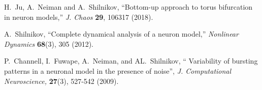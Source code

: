 \documentclass{ws-book9x6}
\begin{document}
\begin{thebibliography}{6}
H.~Ju, A.~Neiman and A.~Shilnikov, \enquote{Bottom-up approach to torus
  bifurcation in neuron models,} \emph{J. Chaos} \textbf{29}, 106317
  (2018).

A.~Shilnikov, \enquote{Complete dynamical analysis of a neuron model,}
  \emph{Nonlinear Dynamics} \textbf{68}(3), 305 (2012).

P.~Channell,  I.~Fuwape, A.~Neiman, and AL.~Shilnikov,  \enquote{ Variability of bursting patterns in a neuronal model in the presence of noise}, \emph{J. Computational Neuroscience,} \textbf{27}(3), 527-542 (2009). 





\end{thebibliography}
\printindex
\end{document}
